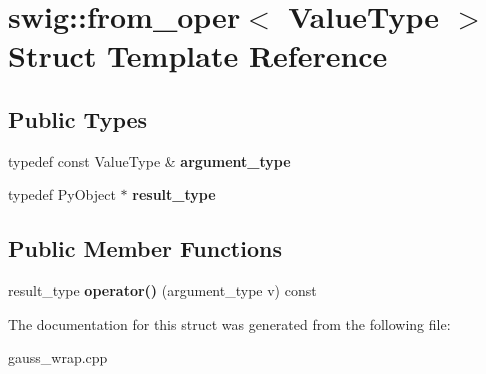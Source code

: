 \hypertarget{structswig_1_1from__oper}{\section{swig\-:\-:from\-\_\-oper$<$ Value\-Type $>$ Struct Template Reference}
\label{structswig_1_1from__oper}
}
\subsection*{Public Types}
\begin{DoxyCompactItemize}
\item 
\hypertarget{structswig_1_1from__oper_a33151174816bb2d002b7b504bcfc1902}{typedef const Value\-Type \& {\bfseries argument\-\_\-type}}\label{structswig_1_1from__oper_a33151174816bb2d002b7b504bcfc1902}

\item 
\hypertarget{structswig_1_1from__oper_aceed5a894a65b69078106cda841f6021}{typedef Py\-Object $\ast$ {\bfseries result\-\_\-type}}\label{structswig_1_1from__oper_aceed5a894a65b69078106cda841f6021}

\end{DoxyCompactItemize}
\subsection*{Public Member Functions}
\begin{DoxyCompactItemize}
\item 
\hypertarget{structswig_1_1from__oper_a5326a4471e2a7e374b63b06d3c0a44ce}{result\-\_\-type {\bfseries operator()} (argument\-\_\-type v) const }\label{structswig_1_1from__oper_a5326a4471e2a7e374b63b06d3c0a44ce}

\end{DoxyCompactItemize}


The documentation for this struct was generated from the following file\-:\begin{DoxyCompactItemize}
\item 
gauss\-\_\-wrap.\-cpp\end{DoxyCompactItemize}
